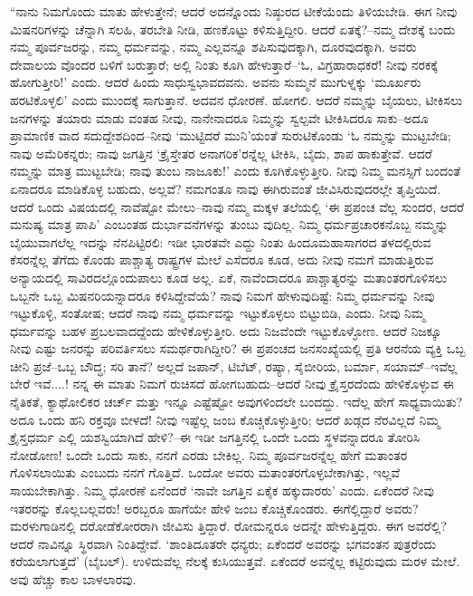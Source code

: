 “ನಾನು ನಿಮಗೊಂದು ಮಾತು ಹೇಳುತ್ತೇನೆ; ಆದರೆ ಅದನ್ನೊಂದು ನಿಷ್ಠುರದ ಟೀಕೆಯೆಂದು ತಿಳಿಯಬೇಡಿ. ಈಗ ನೀವು ಮಿಷನರಿಗಳನ್ನು ಚೆನ್ನಾಗಿ ಸಲಹಿ, ತರಬೇತಿ ನೀಡಿ, ಹಣಕೊಟ್ಟು ಕಳಿಸುತ್ತಿದ್ದೀರಿ. ಆದರೆ ಏತಕ್ಕೆ?–ನಮ್ಮ ದೇಶಕ್ಕೆ ಬಂದು ನಮ್ಮ ಪೂರ್ವಜರನ್ನು, ನಮ್ಮ ಧರ್ಮವನ್ನು, ನಮ್ಮ ಎಲ್ಲವನ್ನೂ ಶಪಿಸುವುದಕ್ಕಾಗಿ, ದೂರವುದಕ್ಕಾಗಿ. ಅವರು ದೇವಾಲಯ ವೊಂದರ ಬಳಿಗೆ ಬರುತ್ತಾರೆ; ಅಲ್ಲಿ ನಿಂತು ಕೂಗಿ ಹೇಳುತ್ತಾರೆ–‘ಓ, ವಿಗ್ರಹಾರಾಧಕರೆ! ನೀವು ನರಕಕ್ಕೆ ಹೋಗುತ್ತೀರಿ!’ ಎಂದು. ಆದರೆ ಹಿಂದು ಸಾಧುಸ್ವಭಾವದವನು. ಅವನು ಸುಮ್ಮನೆ ಮುಗುಳ್ನಕ್ಕು ‘ಮೂರ್ಖರು ಹರಟಿಕೊಳ್ಳಲಿ’ ಎಂದು ಮುಂದಕ್ಕೆ ಸಾಗುತ್ತಾನೆ. ಅದವನ ಧೋರಣೆ. ಹೋಗಲಿ. ಆದರೆ ನಮ್ಮನ್ನು ಬೈಯಲು, ಟೀಕಿಸಲು ಜನಗಳನ್ನು ತಯಾರು ಮಾಡು ವಂತಹ ನೀವು, ನಾನೇನಾದರೂ ನಿಮ್ಮನ್ನು ಸ್ವಲ್ಪವೇ ಟೀಕಿಸಿದರೂ ಸಾಕು–ಅದೂ ಪ್ರಾಮಾಣಿಕ ವಾದ ಸದುದ್ದೇಶದಿಂದ–ನೀವು ‘ಮುಟ್ಟಿದರೆ ಮುನಿ’ಯಂತೆ ಸುರುಟಿಕೊಂಡು ‘ಓ ನಮ್ಮನ್ನು ಮುಟ್ಟಬೇಡಿ; ನಾವು ಅಮೆರಿಕನ್ನರು; ನಾವು ಜಗತ್ತಿನ ‘ಕ್ರೈಸ್ತೇತರ ಅನಾಗರಿಕ’ರನ್ನೆಲ್ಲ ಟೀಕಿಸಿ, ಬೈದು, ಶಾಪ ಹಾಕುತ್ತೇವೆ. ಆದರೆ ನಮ್ಮನ್ನು ಮಾತ್ರ ಮುಟ್ಟಬೇಡಿ; ನಾವು ತುಂಬ ನಾಜೂಕು!’ ಎಂದು ಕೂಗಿಕೊಳ್ಳುತ್ತೀರಿ. ನೀವು ನಿಮ್ಮ ಮನಸ್ಸಿಗೆ ಬಂದಂತೆ ಏನಾದರೂ ಮಾಡಿಕೊಳ್ಳ ಬಹುದು, ಅಲ್ಲವೆ? ನಮಗಂತೂ ನಾವು ಈಗಿರುವಂತೆ ಜೀವಿಸಿರುವುದರಲ್ಲೇ ತೃಪ್ತಿಯಿದೆ. ಆದರೆ ಒಂದು ವಿಷಯದಲ್ಲಿ ನಾವೆಷ್ಟೋ ಮೇಲು–ನಾವು ನಮ್ಮ ಮಕ್ಕಳ ತಲೆಯಲ್ಲಿ ‘ಈ ಪ್ರಪಂಚ ವೆಲ್ಲ ಸುಂದರ, ಆದರೆ ಮನುಷ್ಯ ಮಾತ್ರ ಪಾಪಿ’ ಎಂಬಂತಹ ದುರ್ಭಾವನೆಗಳನ್ನು ತುಂಬು ವುದಿಲ್ಲ. ನಿಮ್ಮ ಧರ್ಮಪ್ರಚಾರಕನೊಬ್ಬ ನಮ್ಮನ್ನು ಬೈಯುವಾಗಲೆಲ್ಲ ಇದನ್ನು ನೆನಪಿಟ್ಟಿರಲಿ: ಇಡೀ ಭಾರತವೇ ಎದ್ದು ನಿಂತು ಹಿಂದೂಮಹಾಸಾಗರದ ತಳದಲ್ಲಿರುವ ಕೆಸರನ್ನೆಲ್ಲ ತೆಗೆದು ಕೊಂಡು ಪಾಶ್ಚಾತ್ಯ ರಾಷ್ಟ್ರಗಳ ಮೇಲೆ ಎಸೆದರೂ ಕೂಡ, ಅದು ನೀವು ನಮಗೆ ಮಾಡುತ್ತಿರುವ ಅನ್ಯಾಯದಲ್ಲಿ ಸಾವಿರದಲ್ಲೊಂದುಪಾಲು ಕೂಡ ಅಲ್ಲ. ಏಕೆ, ನಾವೆಂದಾದರೂ ಪಾಶ್ಚಾತ್ಯರನ್ನು ಮತಾಂತರಗೊಳಿಸಲು ಒಬ್ಬನೇ ಒಬ್ಬ ಮಿಷನರಿಯನ್ನಾದರೂ ಕಳಿಸಿದ್ದೇವೆಯೆ? ನಾವು ನಿಮಗೆ ಹೇಳುವುದಿಷ್ಟೆ: ನಿಮ್ಮ ಧರ್ಮವನ್ನು ನೀವು ಇಟ್ಟುಕೊಳ್ಳಿ, ಸಂತೋಷ; ಆದರೆ ನಾವು ನಮ್ಮ ಧರ್ಮವನ್ನು ಇಟ್ಟುಕೊಳ್ಳಲು ಬಿಟ್ಟುಬಿಡಿ, ಎಂದು. ನೀವು ನಿಮ್ಮ ಧರ್ಮವನ್ನು ಬಹಳ ಪ್ರಬಲವಾದದ್ದೆಂದು ಹೇಳಿಕೊಳ್ಳುತ್ತೀರಿ. ಅದು ನಿಜವೆಂದೇ ಇಟ್ಟುಕೊಳ್ಳೋಣ. ಆದರೆ ನಿಜಕ್ಕೂ ನೀವು ಎಷ್ಟು ಜನರನ್ನು ಪರಿವರ್ತಿಸಲು ಸಮರ್ಥರಾಗಿದ್ದೀರಿ? ಈ ಪ್ರಪಂಚದ ಜನಸಂಖ್ಯೆಯಲ್ಲಿ ಪ್ರತಿ ಆರನೆಯ ವ್ಯಕ್ತಿ ಒಬ್ಬ ಚೀನಿ ಪ್ರಜೆ–ಒಬ್ಬ ಬೌದ್ಧ; ಸರಿ ತಾನೆ? ಅಲ್ಲದೆ ಜಪಾನ್, ಟಿಬೆಟ್, ರಷ್ಯಾ, ಸೈಬೀರಿಯ, ಬರ್ಮಾ, ಸಯಾಮ್​–ಇವೆಲ್ಲ ಬೇರೆ ಇವೆ....! ನನ್ನ ಈ ಮಾತು ನಿಮಗೆ ರುಚಿಸದೆ ಹೋಗಬಹುದು–ಆದರೆ ನೀವು ಕ್ರೈಸ್ತರದೆಂದು ಹೇಳಿಕೊಳ್ಳುವ ಈ ನೈತಿಕತೆ, ಕ್ಯಾಥೋಲಿಕರ ಚರ್ಚ್ ಮತ್ತು ಇನ್ನೂ ಎಷ್ಟೆಷ್ಟೋ ಅವುಗಳಿಂದಲೇ ಬಂದದ್ದು. ಇದೆಲ್ಲ ಹೇಗೆ ಸಾಧ್ಯವಾಯಿತು? ಅದೂ ಒಂದು ಹನಿ ರಕ್ತವೂ ಬೀಳದೆ! ನೀವು ಇಷ್ಟೆಲ್ಲ ಜಂಬ ಕೊಚ್ಚಿಕೊಳ್ಳುತ್ತೀರಿ; ಆದರೆ ಖಡ್ಗದ ನೆರವಿಲ್ಲದೆ ನಿಮ್ಮ ಕ್ರೈಸ್ತಧರ್ಮ ಎಲ್ಲಿ ಯಶಸ್ವಿಯಾಗಿದೆ ಹೇಳಿ?–ಈ ಇಡೀ ಜಗತ್ತಿನಲ್ಲಿ ಒಂದೇ ಒಂದು ಸ್ಥಳವನ್ನಾದರೂ ತೋರಿಸಿ ನೋಡೋಣ! ಒಂದೇ ಒಂದು ಸಾಕು, ನನಗೆ ಎರಡು ಬೇಕಿಲ್ಲ. ನಿಮ್ಮ ಪೂರ್ವಜರನ್ನೆಲ್ಲ ಹೇಗೆ ಮತಾಂತರ ಗೊಳಿಸಲಾಯಿತು ಎಂಬುದು ನನಗೆ ಗೊತ್ತಿದೆ. ಒಂದೋ ಅವರು ಮತಾಂತರಗೊಳ್ಳಬೇಕಾಗಿತ್ತು, ಇಲ್ಲವೆ ಸಾಯಬೇಕಾಗಿತ್ತು. ನಿಮ್ಮ ಧೋರಣೆ ಏನೆಂದರೆ ‘ನಾವೇ ಜಗತ್ತಿನ ಏಕೈಕ ಹಕ್ಕುದಾರರು’ ಎಂದು. ಏಕೆಂದರೆ ನೀವು ಇತರರನ್ನು ಕೊಲ್ಲಬಲ್ಲವರು! ಅರಬ್ಬರೂ ಹಾಗೆಯೇ ಹೇಳಿ ಜಂಬ ಕೊಚ್ಚಿಕೊಂಡರು. ಈಗೆಲ್ಲಿದ್ದಾರೆ ಅವರು? ಮರಳುಗಾಡಿನಲ್ಲಿ ದರೋಡೆಕೋರರಾಗಿ ಜೀವಿಸು ತ್ತಿದ್ದಾರೆ. ರೋಮನ್ನರೂ ಅದನ್ನೇ ಹೇಳುತ್ತಿದ್ದರು. ಈಗ ಅವರೆಲ್ಲಿ? ಆದರೆ ನಾವಿನ್ನೂ ಸ್ಥಿರವಾಗಿ ನಿಂತಿದ್ದೇವೆ. ‘ಶಾಂತಿದೂತರೇ ಧನ್ಯರು; ಏಕೆಂದರೆ ಅವರನ್ನು ಭಗವಂತನ ಪುತ್ರರೆಂದು ಕರೆಯಲಾಗುತ್ತದೆ’ (ಬೈಬಲ್​). ಉಳಿದುವೆಲ್ಲ ನೆಲಕ್ಕೆ ಕುಸಿಯುತ್ತವೆ. ಏಕೆಂದರೆ ಅವನ್ನೆಲ್ಲ ಕಟ್ಟಿರುವುದು ಮರಳ ಮೇಲೆ. ಅವು ಹೆಚ್ಚು ಕಾಲ ಬಾಳಲಾರವು.

